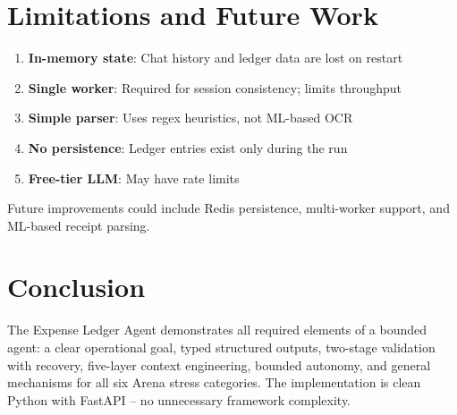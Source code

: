 \documentclass[12pt,a4paper]{article}
\begin{document}
\section{Limitations and Future Work}

\begin{enumerate}
  \item \textbf{In-memory state}: Chat history and ledger data are lost on restart
  \item \textbf{Single worker}: Required for session consistency; limits throughput
  \item \textbf{Simple parser}: Uses regex heuristics, not ML-based OCR
  \item \textbf{No persistence}: Ledger entries exist only during the run
  \item \textbf{Free-tier LLM}: May have rate limits
\end{enumerate}

Future improvements could include Redis persistence, multi-worker support, and ML-based receipt parsing.

\section{Conclusion}

The Expense Ledger Agent demonstrates all required elements of a bounded agent: a clear operational goal, typed structured outputs, two-stage validation with recovery, five-layer context engineering, bounded autonomy, and general mechanisms for all six Arena stress categories. The implementation is clean Python with FastAPI -- no unnecessary framework complexity.
\end{document}
